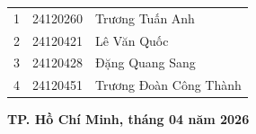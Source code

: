 \begin{center}
{\begin{minipage}{0.95\textwidth}
\begin{center}
\begin{tabular}{ c  l  l }
                    1 & 24120260 & Trương Tuấn Anh \\
                    2 & 24120421 & Lê Văn Quốc \\
                    3 & 24120428 & Đặng Quang Sang \\
                    4 & 24120451 & Trương Đoàn Công Thành \\
                
                \end{tabular}

                
                \vspace{10em}
                \textbf{TP. Hồ Chí Minh, tháng 04 năm 2026}
                \\[1em]
                \textbf{ }
            \end{center}
        \end{minipage}
    }
\end{center}